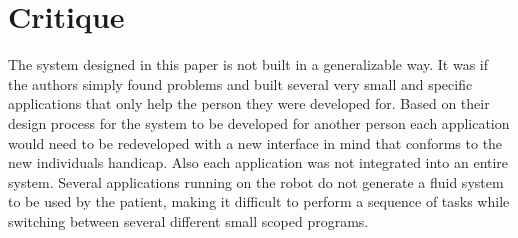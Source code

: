 \documentclass{article}
\begin{document}
\section*{Critique}
The system designed in this paper is not built in a generalizable way. It was if the authors simply found problems and built several very small and specific applications that only help the person they were developed for. Based on their design process for the system to be developed for another person each application would need to be redeveloped with a new interface in mind that conforms to the new individuals handicap. Also each application was not integrated into an entire system. Several applications running on the robot do not generate a fluid system to be used by the patient, making it difficult to perform a sequence of tasks while switching between several different small scoped programs.
\cite{6476704}
\end{document}
